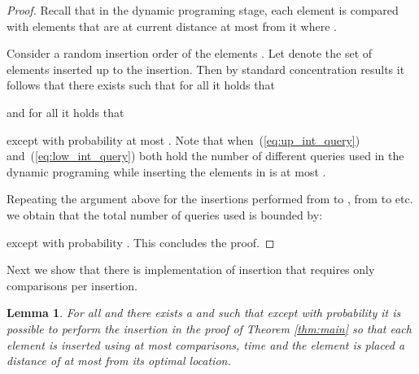 \documentclass[11pt]{article}
\newtheorem{lemma}[theorem]{Lemma}
\begin{document}
\begin{proof}
Recall that in the dynamic programing stage, each element is compared with 
elements that are at current distance at most  from it where 
. 

Consider a random insertion order of the elements . 
Let  denote the set of elements inserted up to the  insertion. 
Then by standard concentration results it follows that there exists 
 such that for all  it holds that 

and for all  it holds that 

except with probability at most . 
Note that when~(\ref{eq:up_int_query}) and~(\ref{eq:low_int_query}) both hold 
the number of different queries used in the dynamic programing while inserting the 
elements in  is at most . 

Repeating the argument above for the insertions performed from 
 to , from  to  etc. we obtain that the total 
number of queries used is bounded by:

except with probability . This concludes the proof. 
\end{proof}

Next we show that there is implementation of insertion that requires only 
 comparisons per insertion.
\begin{lemma} \label{lem:insertion_query}
For all  and  there exists a  
and  
such that except with probability  it is 
 possible to perform the insertion in the proof of Theorem \ref{thm:main} 
so that each element is inserted using at most  
comparisons,  time
and the element 
is placed a distance of at most  from its optimal location. 
\end{lemma}
\end{document}
